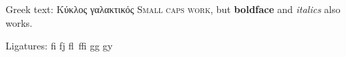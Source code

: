 \documentclass{scrbook}
\begin{document}
  \blinddocument
  Greek text: Κύκλος γαλακτικός
  \textsc{Small caps work,} but \textbf{boldface} and \textit{italics} also works.

  Ligatures: fi fj fl ffi gg gy
\end{document}
